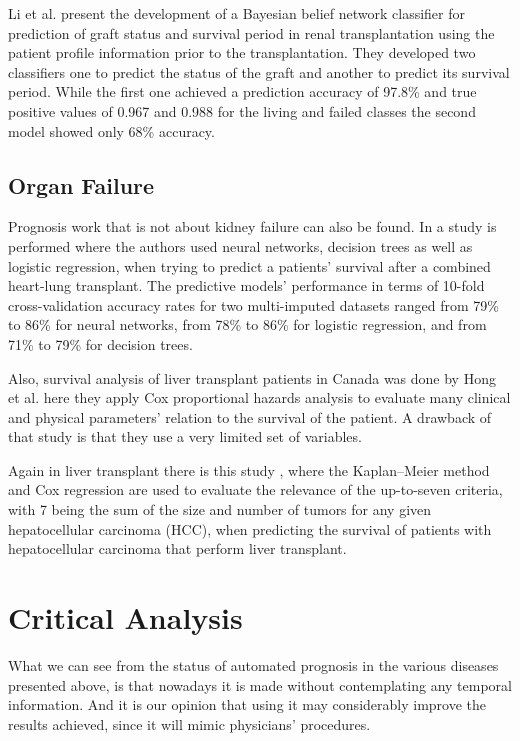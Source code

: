 Li et al. \cite{Li2010} present the development of a Bayesian belief network classifier for prediction of graft status and 
survival period in renal transplantation using the patient profile information prior to the transplantation. They developed two
 classifiers one to predict the status of the graft and another to predict its survival period. While the first one achieved a prediction
 accuracy of 97.8\% and true positive values of 0.967 and 0.988 for the living and failed classes the second model showed only 68\% accuracy.
 
 \subsection{Organ Failure}
 \label{subsection:organ}
 
 Prognosis work that is not about kidney failure can also be found. In \cite{Oztekin2009} a study is performed where the authors
 used neural networks, decision trees as well as logistic regression, when trying to predict a patients’ survival after a combined heart-lung
 transplant. The predictive models’ performance in terms of 10-fold cross-validation accuracy rates for two multi-imputed datasets ranged 
 from 79\% to 86\% for neural networks, from 78\% to 86\% for logistic regression, and from 71\% to 79\% for decision trees.

Also, survival analysis of liver transplant patients in Canada was done by Hong et al. \cite{Hong2006} here they apply Cox proportional 
hazards analysis to evaluate many clinical and physical parameters’ relation to the survival of the patient. A drawback of that study is that
 they use a very limited set of variables.

Again in liver transplant there is this study \cite{Ataide2012}, where the Kaplan–Meier method and Cox regression are used to evaluate
 the relevance of the up-to-seven criteria, with 7 being the sum of the size and number of tumors for any given hepatocellular carcinoma (HCC),
 when predicting the survival of patients with hepatocellular carcinoma that perform liver transplant. 

 \section{Critical Analysis}
 \label{section:analysis}
 
 What we can see from the status of automated prognosis in the various diseases presented above, is that nowadays it is made without 
 contemplating any temporal information. And it is our opinion that using it may considerably improve the results achieved, since it
 will mimic physicians’ procedures. 

